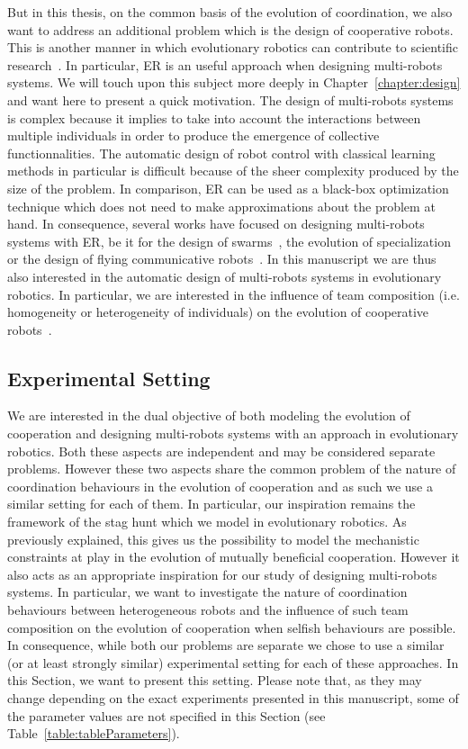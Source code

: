    But in this thesis, on the common basis of the evolution of coordination, we also want to address an additional problem which is the design of cooperative robots. This is another manner in which evolutionary robotics can contribute to scientific research~\parencite{Trianni2014b, Doncieux2015a}. In particular, ER is an useful approach when designing multi-robots systems. We will touch upon this subject more deeply in Chapter~\ref{chapter:design} and want here to present a quick motivation. The design of multi-robots systems is complex because it implies to take into account the interactions between multiple individuals in order to produce the emergence of collective functionnalities. The automatic design of robot control with classical learning methods in particular is difficult because of the sheer complexity produced by the size of the problem. In comparison, ER can be used as a black-box optimization technique which does not need to make approximations about the problem at hand. In consequence, several works have focused on designing multi-robots systems with ER, be it for the design of swarms~\parencite{Baldassarre2007}, the evolution of specialization~\parencite{Ferrante2015} or the design of flying communicative robots~\parencite{Hauert2014}. In this manuscript we are thus also interested in the automatic design of multi-robots systems in evolutionary robotics. In particular, we are interested in the influence of team composition (i.e. homogeneity or heterogeneity of individuals) on the evolution of cooperative robots~\parencite{Waibel2009}.


  \subsection{Experimental Setting}

    We are interested in the dual objective of both modeling the evolution of cooperation and designing multi-robots systems with an approach in evolutionary robotics. Both these aspects are independent and may be considered separate problems. However these two aspects share the common problem of the nature of coordination behaviours in the evolution of cooperation and as such we use a similar setting for each of them. In particular, our inspiration remains the framework of the stag hunt which we model in evolutionary robotics. As previously explained, this gives us the possibility to model the mechanistic constraints at play in the evolution of mutually beneficial cooperation. However it also acts as an appropriate inspiration for our study of designing multi-robots systems. In particular, we want to investigate the nature of coordination behaviours between heterogeneous robots and the influence of such team composition on the evolution of cooperation when selfish behaviours are possible. In consequence, while both our problems are separate we chose to use a similar (or at least strongly similar) experimental setting for each of these approaches. In this Section, we want to present this setting. Please note that, as they may change depending on the exact experiments presented in this manuscript, some of the parameter values are not specified in this Section (see Table~\ref{table:tableParameters}).

